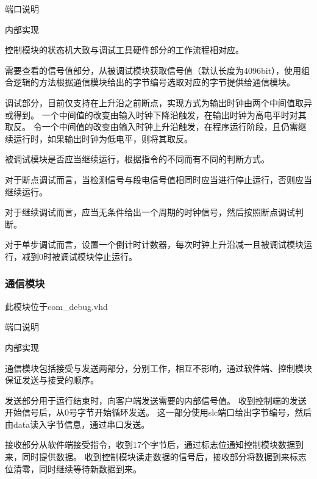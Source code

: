             端口说明

                

            内部实现

                控制模块的状态机大致与调试工具硬件部分的工作流程相对应。

                需要查看的信号值部分，从被调试模块获取信号值（默认长度为4096bit），使用组合逻辑的方法根据通信模块给出的字节编号选取对应的字节提供给通信模块。

                调试部分，目前仅支持在上升沿之前断点，实现方式为输出时钟由两个中间值取异或得到。
                一个中间值的改变由输入时钟下降沿触发，在输出时钟为高电平时对其取反。
                令一个中间值的改变由输入时钟上升沿触发，在程序运行阶段，且仍需继续运行时，如果输出时钟为低电平，则将其取反。

                被调试模块是否应当继续运行，根据指令的不同而有不同的判断方式。

                对于断点调试而言，当检测信号与段电信号值相同时应当进行停止运行，否则应当继续运行。

                对于继续调试而言，应当无条件给出一个周期的时钟信号，然后按照断点调试判断。

                对于单步调试而言，设置一个倒计时计数器，每次时钟上升沿减一且被调试模块运行，减到0时被调试模块停止运行。

        \subsubsection{通信模块}
            此模块位于com\_debug.vhd

            端口说明

                
            内部实现

                通信模块包括接受与发送两部分，分别工作，相互不影响，通过软件端、控制模块保证发送与接受的顺序。

                发送部分用于运行结束时，向客户端发送需要的内部信号值。%
                收到控制端的发送开始信号后，从0号字节开始循环发送。%
                这一部分使用slc端口给出字节编号，然后由data读入字节信息，通过串口发送。

                接收部分从软件端接受指令，收到17个字节后，通过标志位通知控制模块数据到来，同时提供数据。%
                收到控制模块读走数据的信号后，接收部分将数据到来标志位清零，同时继续等待新数据到来。

